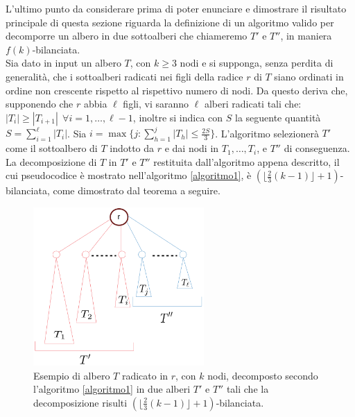 L'ultimo punto da considerare prima di poter enunciare e dimostrare il risultato principale di questa sezione riguarda la definizione di un algoritmo valido per decomporre un albero in due sottoalberi che chiameremo $ T' $ e $ T'' $, in maniera $ f(k) $-bilanciata.\\
Sia dato in input un albero $ T $, con $ k\ge 3 $ nodi e
si supponga, senza perdita di generalit\`a, che i sottoalberi radicati nei figli della radice $ r $ di $ T $ siano ordinati in ordine non crescente rispetto al rispettivo numero di nodi.
Da questo deriva che, supponendo che $ r $ abbia $ \ell $ figli, vi saranno $ \ell $ alberi radicati tali che: $ |T_{i}|\ge |T_{i+1}| \ \  \forall {i = 1,\dots, \ell-1} $, inoltre si indica con $ S $ la seguente quantit\`a $ S=\sum_{i=1}^{\ell}|T_i| $.
Sia $i = \max \{ j : \sum_{h=1}^{j} |T_h| \le \frac{2 S}{3} \}$. L'algoritmo selezionerà $T'$ come il sottoalbero di $T$ indotto da $r$ e dai nodi in $T_1, \dots, T_i$, e $T''$ di conseguenza.
La decomposizione di $T$ in $T'$ e $T''$ restituita dall'algoritmo appena descritto, il cui pseudocodice è mostrato nell'algoritmo \ref{algoritmo1}, è $ (\lfloor \frac{2}{3}(k-1) \rfloor + 1)$-bilanciata, come dimostrato dal teorema a seguire.

	\begin{figure}[htbp]
	\centering
	\includegraphics[width=6.5cm]{capitolo3/grafo4}
	\caption{Esempio di albero $ T $ radicato in $ r $, con $ k $ nodi, decomposto secondo l'algoritmo \ref{algoritmo1} in due alberi $ T' $ e $ T'' $ tali che la decomposizione risulti $ (\lfloor \frac{2}{3}(k-1) \rfloor + 1)$-bilanciata.}
	\label{fig:3} 
\end{figure}

